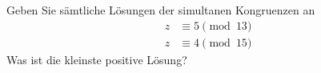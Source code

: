 \begin{aufgabe}[{Klausurvorbereitung 8}]
Geben Sie sämtliche Lösungen der simultanen Kongruenzen an
\begin{align*}
z &\equiv 5 \pmod{13}\\
z &\equiv 4 \pmod{15}
\end{align*}
Was ist die kleinste positive Lösung?
\end{aufgabe}
